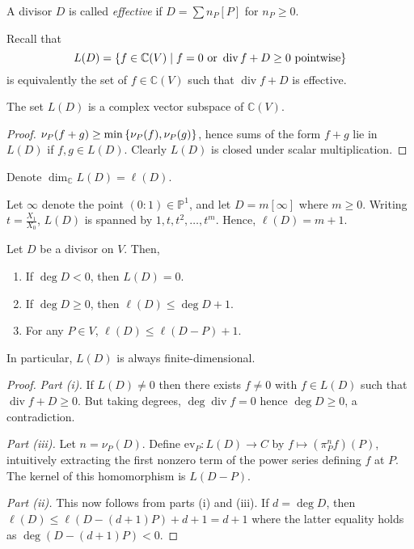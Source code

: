 \begin{definition}
    A divisor \( D \) is called \emph{effective} if \( D = \sum n_P [P] \) for \( n_P \geq 0 \).
\end{definition}
Recall that
\[ L(D) = \qty{f \in \mathbb C(V) \mid f = 0 \text{ or } \operatorname{div}f + D \geq 0 \text{ pointwise}} \]
is equivalently the set of \( f \in \mathbb C(V) \) such that \( \operatorname{div}f + D \) is effective.
\begin{proposition}
    The set \( L(D) \) is a complex vector subspace of \( \mathbb C(V) \).
\end{proposition}
\begin{proof}
    \( \nu_P(f+g) \geq \min\qty{\nu_P(f), \nu_P(g)} \), hence sums of the form \( f + g \) lie in \( L(D) \) if \( f, g \in L(D) \).
    Clearly \( L(D) \) is closed under scalar multiplication.
\end{proof}
\begin{definition}
    Denote \( \dim_{\mathbb C} L(D) = \ell(D) \).
\end{definition}
\begin{example}
    Let \( \infty \) denote the point \( (0:1) \in \mathbb P^1 \), and let \( D = m [\infty] \) where \( m \geq 0 \).
    Writing \( t = \frac{X_1}{X_0} \), \( L(D) \) is spanned by \( 1, t, t^2, \dots, t^m \).
    Hence, \( \ell(D) = m + 1 \).
\end{example}
\begin{proposition}
    Let \( D \) be a divisor on \( V \).
    Then,
    \begin{enumerate}
        \item If \( \deg D < 0 \), then \( L(D) = 0 \).
        \item If \( \deg D \geq 0 \), then \( \ell(D) \leq \deg D + 1 \).
        \item For any \( P \in V \), \( \ell(D) \leq \ell(D - P) + 1 \).
    \end{enumerate}
    In particular, \( L(D) \) is always finite-dimensional.
\end{proposition}
\begin{proof}
    \emph{Part (i).}
    If \( L(D) \neq 0 \) then there exists \( f \neq 0 \) with \( f \in L(D) \) such that \( \operatorname{div} f + D \geq 0 \).
    But taking degrees, \( \deg \operatorname{div} f = 0 \) hence \( \deg D \geq 0 \), a contradiction.

    \emph{Part (iii).}
    Let \( n = \nu_P(D) \).
    Define \( \mathrm{ev}_P \colon L(D) \to C \) by \( f \mapsto (\pi_P^n f)(P) \), intuitively extracting the first nonzero term of the power series defining \( f \) at \( P \).
    The kernel of this homomorphism is \( L(D-P) \).

    \emph{Part (ii).}
    This now follows from parts (i) and (iii).
    If \( d = \deg D \), then \( \ell(D) \leq \ell(D - (d+1)P) + d + 1 = d + 1 \) where the latter equality holds as \( \deg(D - (d + 1)P) < 0 \).
\end{proof}
